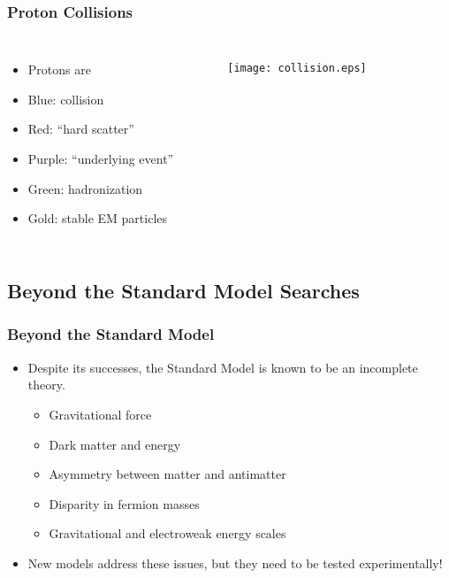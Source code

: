\begin{frame}[t, label=proton_collision]
    \frametitle{Proton Collisions}
    \begin{columns}
        \begin{itemize}
        \item Protons are
        \item Blue: collision
        \item Red: ``hard scatter''
        \item Purple: ``underlying event''
        \item Green: hadronization
        \item Gold: stable EM particles
        \end{itemize}
\begin{figure}
\centering
\texttt{[image: collision.eps]}
\end{figure}
\end{columns}
\end{frame}

\subsection{Beyond the Standard Model Searches}

\begin{frame}
    \frametitle[label=bsm]{Beyond the Standard Model}
\begin{itemize}
    \item Despite its successes, the Standard Model is known to be an
        incomplete theory.
\begin{itemize}
    \item Gravitational force
    \item Dark matter and energy
    \item Asymmetry between matter and antimatter
    \item Disparity in fermion masses
    \item Gravitational and electroweak energy scales
    \end{itemize}
    \item New models address these issues, but they need to be tested
        experimentally!
\end{itemize}
\end{frame}

